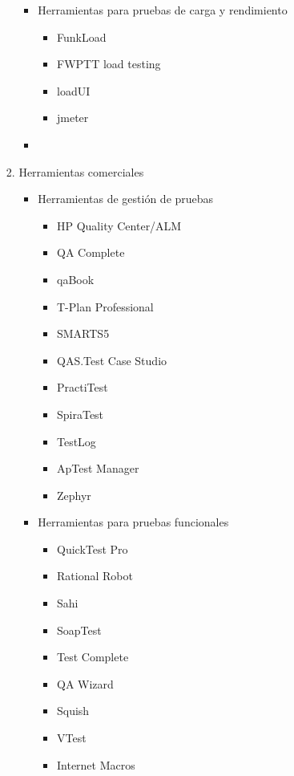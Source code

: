 \documentclass[12pt,a4paper,oneside]{book}
\begin{document}
\begin{enumerate}
\begin{itemize}
\begin{enumerate}
\begin{itemize}
\begin{itemize}
									\end{itemize}
								\item Herramientas para pruebas de carga y rendimiento 
									\begin{itemize}
										\item FunkLoad
										\item FWPTT load testing
										\item loadUI
										\item jmeter
									\end{itemize}
								\item
								
							\end{itemize}
						\item Herramientas comerciales
							\begin{itemize}
								\item Herramientas de gestión de pruebas 
									\begin{itemize}
										\item HP Quality Center/ALM
										\item QA Complete
										\item qaBook
										\item T-Plan Professional
										\item SMARTS5
										\item QAS.Test Case Studio
										\item PractiTest
										\item SpiraTest
										\item TestLog
										\item ApTest Manager
										\item Zephyr
								
									\end{itemize}
								\item Herramientas para pruebas funcionales
									\begin{itemize}
										\item QuickTest Pro
										\item Rational Robot
										\item Sahi
										\item SoapTest
										\item Test Complete
										\item QA Wizard
										\item Squish
										\item VTest
										\item Internet Macros
										

\end{itemize}
\end{itemize}
\end{enumerate}
\end{itemize}
\end{enumerate}
\end{document}
